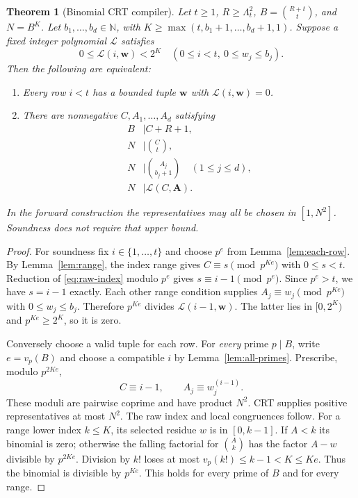 \documentclass[11pt]{article}
\newtheorem{theorem}{Theorem}[section]
\theoremstyle{definition}
\newcommand{\N}{\mathbb N}
\newcommand{\LL}{\mathcal L}
\begin{document}
\begin{theorem}[Binomial CRT compiler]\label{thm:crt}
Let $t\ge1$, $R\ge\Lambda_t^2$, $B=\binom{R+t}{t}$, and $N=B^K$.
Let $b_1,\ldots,b_d\in\N$, with
$K\ge\max(t,b_1+1,\ldots,b_d+1,1)$.
Suppose a fixed integer polynomial $\LL$ satisfies
\[
 0\le\LL(i,\boldsymbol w)<2^K
 \quad(0\le i<t,\ 0\le w_j\le b_j).
\]
Then the following are equivalent:
\begin{enumerate}
\item Every row $i<t$ has a bounded tuple $\boldsymbol w$ with
      $\LL(i,\boldsymbol w)=0$.
\item There are nonnegative $C,A_1,\ldots,A_d$ satisfying
\begin{align}
 B&\mid C+R+1,\label{eq:raw-index}\\
 N&\mid\binom{C}{t},\label{eq:range-index}\\
 N&\mid\binom{A_j}{b_j+1}\quad(1\le j\le d),\label{eq:range-columns}\\
 N&\mid\LL(C,\boldsymbol A).\label{eq:local-congruence}
\end{align}
\end{enumerate}
In the forward construction the representatives may all be chosen in
$[1,N^2]$. Soundness does not require that upper bound.
\end{theorem}

\begin{proof}
For soundness fix $i\in\{1,\ldots,t\}$ and choose $p^e$ from
Lemma~\ref{lem:each-row}. By Lemma~\ref{lem:range}, the index range
gives $C\equiv s\pmod{p^{Ke}}$ with $0\le s<t$. Reduction of
\eqref{eq:raw-index} modulo $p^e$ gives
$s\equiv i-1\pmod{p^e}$. Since $p^e>t$, we have $s=i-1$ exactly.
Each other range condition supplies $A_j\equiv w_j\pmod{p^{Ke}}$
with $0\le w_j\le b_j$. Therefore $p^{Ke}$ divides
$\LL(i-1,\boldsymbol w)$. The latter lies in $[0,2^K)$ and
$p^{Ke}\ge2^K$, so it is zero.

Conversely choose a valid tuple for each row. For \emph{every} prime
$p\mid B$, write $e=v_p(B)$ and choose a compatible $i$ by
Lemma~\ref{lem:all-primes}. Prescribe, modulo $p^{2Ke}$,
\[
 C\equiv i-1,\qquad A_j\equiv w_j^{(i-1)}.
\]
These moduli are pairwise coprime and have product $N^2$. CRT supplies
positive representatives at most $N^2$. The raw index and local
congruences follow. For a range lower index $k\le K$, its selected
residue $w$ is in $[0,k-1]$. If $A<k$ its binomial is zero; otherwise
the falling factorial for $\binom{A}{k}$ has the factor $A-w$ divisible
by $p^{2Ke}$. Division by $k!$ loses at most
$v_p(k!)\le k-1<K\le Ke$. Thus the binomial is divisible by
$p^{Ke}$. This holds for every prime of $B$ and for every range.
\end{proof}
\end{document}
